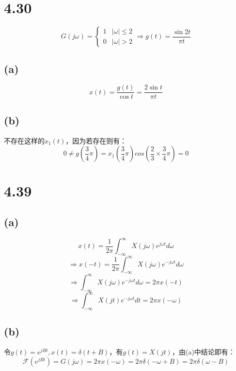 \documentclass[UTF8,fontset=fandol,12pt,a4paper]{ctexart}
\begin{document}
\section*{4.30}
\[G(j\omega)=\begin{cases}
  1 &|\omega|\le2\\
  0 &|\omega|>2
\end{cases}\Rightarrow g(t)=\frac{\sin{2t}}{\pi t}\]
\subsection*{(a)}
\[x(t)=\frac{g(t)}{\cos{t}}=\frac{2\sin{t}}{\pi t}\]
\subsection*{(b)}
不存在这样的$x_1(t)$，因为若存在则有：
\[0\ne g(\frac{3}{4}\pi)=x_1(\frac{3}{4}\pi)cos{(\frac{2}{3}\times\frac{3}{4}\pi)}=0\]

\section*{4.39}
\subsection*{(a)}
\[x(t)=\frac{1}{2\pi}\int_{-\infty}^{\infty}X(j\omega)e^{j\omega t}d\omega\]
\[\Longrightarrow x(-t)=\frac{1}{2\pi}\int_{-\infty}^{\infty}X(j\omega)e^{-j\omega t}d\omega\]
\[\Longrightarrow \int_{-\infty}^{\infty}X(j\omega)e^{-j\omega t}d\omega=2\pi x(-t)\]
\[\Longrightarrow \int_{-\infty}^{\infty}X(jt)e^{-j\omega t}dt=2\pi x(-\omega)\]

\subsection*{(b)}
令$g(t)=e^{jBt}, x(t)=\delta(t+B)$，有$g(t)=X(jt)$，由(a)中结论即有：
\[\mathcal{F}(e^{jBt})=G(j\omega)=2\pi x(-\omega)=2\pi\delta(-\omega+B)=2\pi\delta(\omega-B)\]
\end{document}
